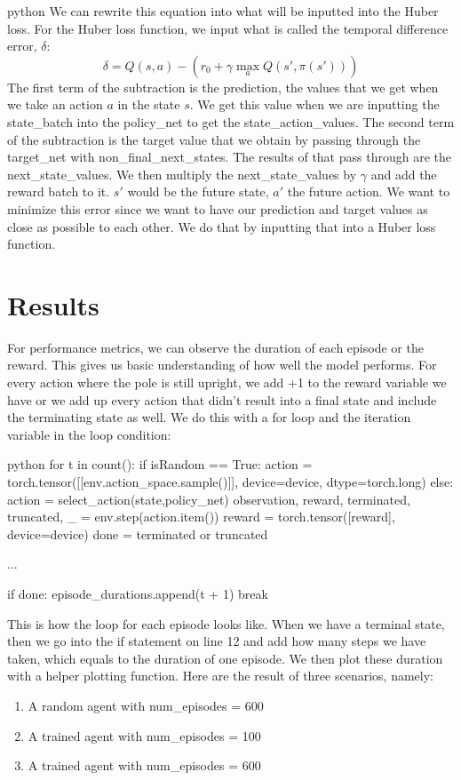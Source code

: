 \documentclass{article}
\numberwithin{equation}{section}
\numberwithin{equation}{section}
\begin{document}
\begin{enumarte}
\begin{mintedbox}{python}
We can rewrite this equation into what will be inputted into the Huber loss.
For the Huber loss function, we input what is called the temporal difference error, $\delta$:
$$
\delta = Q(s,a) - \left(r_0 + \gamma \max_a Q(s',\pi(s'))\right)
$$
The first term of the subtraction is the prediction, the values that we get when we take an action $a$ in the state $s$. We get this value when we are inputting the state\_batch into the policy\_net to get the state\_action\_values. The second term of the subtraction is the target value that we obtain by passing through the target\_net with non\_final\_next\_states. The results of that pass through are the next\_state\_values. We then multiply the next\_state\_values by $\gamma$ and add the reward batch to it. $s'$ would be the future state, $a'$ the future action.  We want to minimize this error since we want to have our prediction and target values as close as possible to each other. We do that by inputting that into a Huber loss function. 










\section*{Results}
For performance metrics, we can observe the duration of each episode or the reward. This gives us basic understanding of how well the model performs. For every action where the pole is still upright, we add +1 to the reward variable we have or we add up every action that didn't result into a final state and include the terminating state as well. We do this with a for loop and the iteration variable in the loop condition:


\begin{mintedbox}{python}
for t in count():
	if isRandom  == True:
	  action = torch.tensor([[env.action_space.sample()]], device=device, dtype=torch.long)
	else:
	  action = select_action(state,policy_net)
	observation, reward, terminated, truncated, _ = env.step(action.item())
	reward = torch.tensor([reward], device=device)
	done = terminated or truncated

	...
	
	if done:
		episode_durations.append(t + 1)
		break
\end{mintedbox}

This is how the loop for each episode looks like. When we have a terminal state, then we go into the if statement on line 12 and add how many steps we have taken, which equals to the duration of one episode. We then plot these duration with a helper plotting function. Here are the result of three scenarios, namely:
\begin{enumerate}
\item A random agent with num\_episodes = 600
\item A trained agent with num\_episodes = 100
\item A trained agent with num\_episodes = 600
\end{enumerate}



\end{mintedbox}
\end{enumarte}
\end{document}
